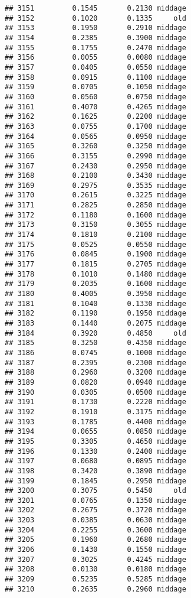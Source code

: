 \documentclass[
]{article}
\begin{document}
\begin{verbatim}
## 3151         0.1545       0.2130 middage
## 3152         0.1020       0.1335     old
## 3153         0.1950       0.2910 middage
## 3154         0.2385       0.3900 middage
## 3155         0.1755       0.2470 middage
## 3156         0.0055       0.0080 middage
## 3157         0.0405       0.0550 middage
## 3158         0.0915       0.1100 middage
## 3159         0.0705       0.1050 middage
## 3160         0.0560       0.0750 middage
## 3161         0.4070       0.4265 middage
## 3162         0.1625       0.2200 middage
## 3163         0.0755       0.1700 middage
## 3164         0.0565       0.0950 middage
## 3165         0.3260       0.3250 middage
## 3166         0.3155       0.2990 middage
## 3167         0.2430       0.2950 middage
## 3168         0.2100       0.3430 middage
## 3169         0.2975       0.3535 middage
## 3170         0.2615       0.3225 middage
## 3171         0.2825       0.2850 middage
## 3172         0.1180       0.1600 middage
## 3173         0.3150       0.3055 middage
## 3174         0.1810       0.2100 middage
## 3175         0.0525       0.0550 middage
## 3176         0.0845       0.1900 middage
## 3177         0.1815       0.2705 middage
## 3178         0.1010       0.1480 middage
## 3179         0.2035       0.1600 middage
## 3180         0.4005       0.3950 middage
## 3181         0.1040       0.1330 middage
## 3182         0.1190       0.1950 middage
## 3183         0.1440       0.2075 middage
## 3184         0.3920       0.4850     old
## 3185         0.3250       0.4350 middage
## 3186         0.0745       0.1000 middage
## 3187         0.2395       0.2300 middage
## 3188         0.2960       0.3200 middage
## 3189         0.0820       0.0940 middage
## 3190         0.0305       0.0500 middage
## 3191         0.1730       0.2220 middage
## 3192         0.1910       0.3175 middage
## 3193         0.1785       0.4400 middage
## 3194         0.0655       0.0850 middage
## 3195         0.3305       0.4650 middage
## 3196         0.1330       0.2400 middage
## 3197         0.0680       0.0895 middage
## 3198         0.3420       0.3890 middage
## 3199         0.1845       0.2950 middage
## 3200         0.3075       0.5450     old
## 3201         0.0765       0.1350 middage
## 3202         0.2675       0.3720 middage
## 3203         0.0385       0.0630 middage
## 3204         0.2255       0.3600 middage
## 3205         0.1960       0.2680 middage
## 3206         0.1430       0.1550 middage
## 3207         0.3025       0.4245 middage
## 3208         0.0130       0.0180 middage
## 3209         0.5235       0.5285 middage
## 3210         0.2635       0.2960 middage

\end{verbatim}
\end{document}

